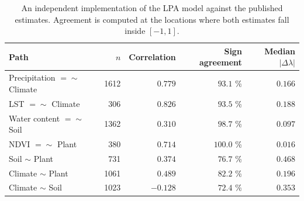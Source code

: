 \begin{table}[!ht]
\centering
\caption{An independent implementation of the LPA model against the published estimates. Agreement is computed at the locations where both estimates fall inside $[-1, 1]$.}
\label{tab:lpa-refit}
\begin{tabular}{lrrrr}
\hline
Path & $n$ & Correlation & Sign agreement & Median $|\Delta\lambda|$ \\
\hline
Precipitation $=\sim$ Climate & 1612 & $0.779$ & $93.1$ \% & $0.166$ \\
LST $=\sim$ Climate & 306 & $0.826$ & $93.5$ \% & $0.188$ \\
Water content $=\sim$ Soil & 1362 & $0.310$ & $98.7$ \% & $0.097$ \\
NDVI $=\sim$ Plant & 380 & $0.714$ & $100.0$ \% & $0.016$ \\
Soil $\sim$ Plant & 731 & $0.374$ & $76.7$ \% & $0.468$ \\
Climate $\sim$ Plant & 1061 & $0.489$ & $82.2$ \% & $0.196$ \\
Climate $\sim$ Soil & 1023 & $-0.128$ & $72.4$ \% & $0.353$ \\
\hline
\end{tabular}
\end{table}
